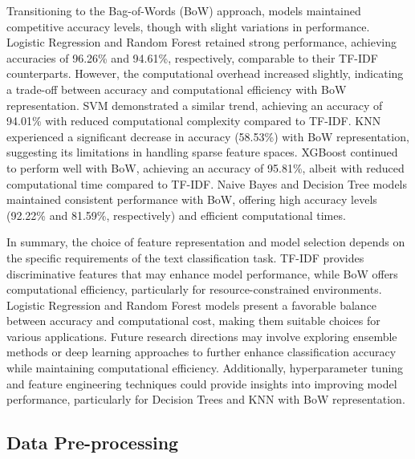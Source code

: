 Transitioning to the Bag-of-Words (BoW) approach, models maintained competitive accuracy levels, though with slight variations in performance. Logistic Regression and Random Forest retained strong performance, achieving accuracies of 96.26\% and 94.61\%, respectively, comparable to their TF-IDF counterparts. However, the computational overhead increased slightly, indicating a trade-off between accuracy and computational efficiency with BoW representation. SVM demonstrated a similar trend, achieving an accuracy of 94.01\% with reduced computational complexity compared to TF-IDF. KNN experienced a significant decrease in accuracy (58.53\%) with BoW representation, suggesting its limitations in handling sparse feature spaces. XGBoost continued to perform well with BoW, achieving an accuracy of 95.81\%, albeit with reduced computational time compared to TF-IDF. Naive Bayes and Decision Tree models maintained consistent performance with BoW, offering high accuracy levels (92.22\% and 81.59\%, respectively) and efficient computational times.

In summary, the choice of feature representation and model selection depends on the specific requirements of the text classification task. TF-IDF provides discriminative features that may enhance model performance, while BoW offers computational efficiency, particularly for resource-constrained environments. Logistic Regression and Random Forest models present a favorable balance between accuracy and computational cost, making them suitable choices for various applications. Future research directions may involve exploring ensemble methods or deep learning approaches to further enhance classification accuracy while maintaining computational efficiency. Additionally, hyperparameter tuning and feature engineering techniques could provide insights into improving model performance, particularly for Decision Trees and KNN with BoW representation.

\subsection{Data Pre-processing}

